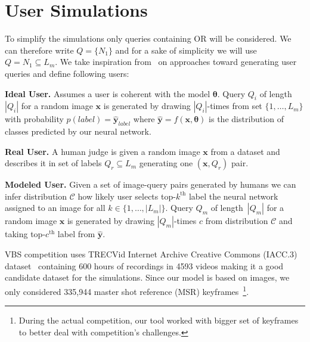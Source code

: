 \section{User Simulations}
To simplify the simulations only queries containing \textsf{OR} will be considered. We can therefore write $Q=\{N_1\}$ and for a sake of simplicity we will use $Q=N_1\subseteq L_m$.
We take inspiration from~\cite{kovalvcik2017comparison} on approaches toward generating user queries and define following users:
\begin{description}[labelwidth=1em, leftmargin=!]
	\item \textbf{Ideal User.} Assumes a user is coherent with the model $\bm{\theta}$. Query $Q_i$ of length~$|Q_i|$ for a random image $\bm{x}$ is generated by drawing $|Q_i|$-times from set $\{1,\dots,L_m\}$ with probability $p(label)=\bm{\hat{y}}_{label}$ where $\bm{\hat{y}}=f\left(\bm{x}, \bm{\theta}\right)$ is the distribution of classes predicted by our neural network.
	\item \textbf{Real User.} A human judge is given a random image $\bm{x}$ from a dataset and describes it in set of labels $Q_r\subseteq L_m$ generating one $(\bm{x},Q_r)$ pair.
	\item \textbf{Modeled User.} Given a set of image-query pairs generated by humans we can infer distribution $\mathcal{C}$ how likely user selects top-$k^{\mathrm{th}}$ label the neural network assigned to an image for all $k\in\{1,\dots,|L_m|\}$.
	Query $Q_m$ of length~$|Q_m|$ for a random image $\bm{x}$ is generated by drawing $|Q_m|$-times $c$ from distribution $\mathcal{C}$ and taking top-$c^{\mathrm{th}}$ label from $\bm{\hat{y}}$.
\end{description}
VBS competition uses TRECVid Internet Archive Creative Commons (IACC.3) dataset~\cite{awad2016trecvid} containing 600 hours of recordings in 4593 videos making it a good candidate dataset for the simulations. Since our model is based on images, we only considered 335,944 master shot reference (MSR) keyframes~\cite{MasterShotReference}\footnote{During the actual competition, our tool worked with bigger set of keyframes to better deal with competition's challenges.}.

